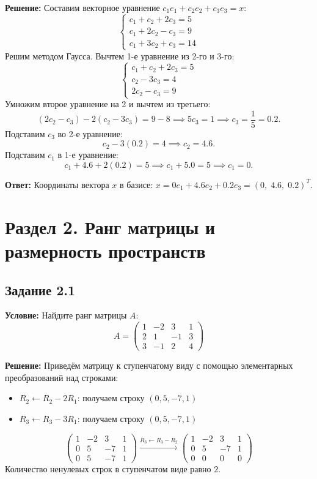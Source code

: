 \documentclass[11pt, a4paper]{article}
\begin{document}
\textbf{Решение:}
Составим векторное уравнение $c_1 e_1 + c_2 e_2 + c_3 e_3 = x$:
$$ \begin{cases} c_1 + c_2 + 2c_3 = 5 \\ c_1 + 2c_2 - c_3 = 9 \\ c_1 + 3c_2 + c_3 = 14 \end{cases} $$
Решим методом Гаусса. Вычтем 1-е уравнение из 2-го и 3-го:
$$ \begin{cases} c_1 + c_2 + 2c_3 = 5 \\ c_2 - 3c_3 = 4 \\ 2c_2 - c_3 = 9 \end{cases} $$
Умножим второе уравнение на 2 и вычтем из третьего:
$$ (2c_2 - c_3) - 2(c_2 - 3c_3) = 9 - 8 \implies 5c_3 = 1 \implies c_3 = \frac{1}{5} = 0.2. $$
Подставим $c_3$ во 2-е уравнение:
$$ c_2 - 3(0.2) = 4 \implies c_2 = 4.6. $$
Подставим $c_1$ в 1-е уравнение:
$$ c_1 + 4.6 + 2(0.2) = 5 \implies c_1 + 5.0 = 5 \implies c_1 = 0. $$

\textbf{Ответ:} Координаты вектора $x$ в базисе: $x = 0e_1 + 4.6e_2 + 0.2e_3 = (0, \; 4.6, \; 0.2)^T$.

\newpage

\section{Раздел 2. Ранг матрицы и размерность пространств}

\subsection*{Задание 2.1}
\textbf{Условие:} Найдите ранг матрицы $A$:
$$ A = \begin{pmatrix} 1 & -2 & 3 & 1 \\ 2 & 1 & -1 & 3 \\ 3 & -1 & 2 & 4 \end{pmatrix} $$

\textbf{Решение:}
Приведём матрицу к ступенчатому виду с помощью элементарных преобразований над строками:
\begin{itemize}
\item $R_2 \leftarrow R_2 - 2R_1$: получаем строку $(0, 5, -7, 1)$
\item $R_3 \leftarrow R_3 - 3R_1$: получаем строку $(0, 5, -7, 1)$
\end{itemize}
$$ \begin{pmatrix} 1 & -2 & 3 & 1 \\ 0 & 5 & -7 & 1 \\ 0 & 5 & -7 & 1 \end{pmatrix} \xrightarrow{R_3 \leftarrow R_3 - R_2} \begin{pmatrix} 1 & -2 & 3 & 1 \\ 0 & 5 & -7 & 1 \\ 0 & 0 & 0 & 0 \end{pmatrix} $$
Количество ненулевых строк в ступенчатом виде равно $2$.
\end{document}
